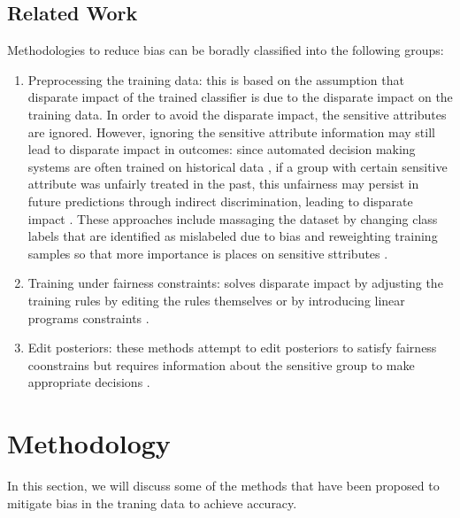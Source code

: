 \documentclass[runningheads]{llncs}
\begin{document}
\subsection{Related Work}
Methodologies to reduce bias can be boradly classified into the following groups:
\begin{enumerate}
\item Preprocessing the training data: this is based on the assumption that disparate impact of the trained classifier is due to the disparate impact on the training data. In order to avoid the disparate impact, the sensitive attributes are ignored. However, ignoring the sensitive attribute information may still lead to disparate impact in outcomes: since automated decision making systems are often trained on historical data , if a group with certain sensitive attribute was unfairly treated in the past, this unfairness may persist in future predictions through indirect discrimination, leading to disparate impact \cite{zafar2015fairness}. These approaches include massaging the dataset \cite{calders2009building} \cite{kamiran2009classifying} \cite{kamiran2012data} \cite{vzliobaite2011handling} by changing class labels that are identified as mislabeled due to bias and reweighting training samples so that more importance is places on sensitive sttributes \cite{calders2009building} \cite{kamiran2012data}.
\item Training under fairness constraints: solves disparate impact by adjusting the training rules by editing the rules themselves \cite{calders2013controlling} \cite{zafar2015fairness} or by introducing linear programs constraints \cite{celis2017ranking} \cite{dwork2012fairness} \cite{romei2014multidisciplinary} \cite{zafar2015fairness}.
\item Edit posteriors: these methods attempt to edit posteriors to satisfy fairness coonstrains but requires information about the sensitive group to make appropriate decisions \cite{dionne2014economic} \cite{doherty2012information} \cite{feldman2015computational} \cite{hardt2016equality}. 
\end{enumerate}
\section{Methodology}
In this section, we will discuss some of the methods that have been proposed to mitigate bias in the traning data to achieve accuracy.
\end{document}
